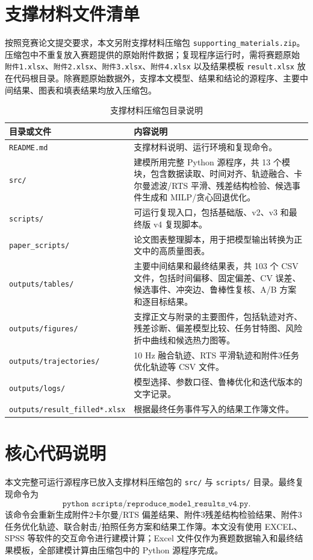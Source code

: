 \documentclass{cumcmthesis}
\begin{document}
\clearpage
\appendix
\section{支撑材料文件清单}
按照竞赛论文提交要求，本文另附支撑材料压缩包 \texttt{supporting\_materials.zip}。压缩包中不重复放入赛题提供的原始附件数据；复现程序运行时，需将赛题原始 \texttt{附件1.xlsx}、\texttt{附件2.xlsx}、\texttt{附件3.xlsx}、\texttt{附件4.xlsx} 以及结果模板 \texttt{result.xlsx} 放在代码根目录。除赛题原始数据外，支撑本文模型、结果和结论的源程序、主要中间结果、图表和填表结果均放入压缩包。

\begin{table}[H]
  \centering
  \caption{支撑材料压缩包目录说明}
  \label{tab:supporting_materials}
  \footnotesize
  \begin{tabular}{p{}p{}}
    \toprule
    目录或文件 & 内容说明\\
    \midrule
    \texttt{README.md} & 支撑材料说明、运行环境和复现命令。\\
    \texttt{src/} & 建模所用完整 Python 源程序，共 13 个模块，包含数据读取、时间对齐、轨迹融合、卡尔曼滤波/RTS 平滑、残差结构检验、候选事件生成和 MILP/贪心回退优化。\\
    \texttt{scripts/} & 可运行复现入口，包括基础版、v2、v3 和最终版 v4 复现脚本。\\
    \texttt{paper\_scripts/} & 论文图表整理脚本，用于把模型输出转换为正文中的高质量图表。\\
    \texttt{outputs/tables/} & 主要中间结果和最终结果表，共 103 个 CSV 文件，包括时间偏移、固定偏差、CV 误差、候选事件、冲突边、鲁棒性复核、A/B 方案和逐目标结果。\\
    \texttt{outputs/figures/} & 支撑正文与附录的主要图件，包括轨迹对齐、残差诊断、偏差模型比较、任务甘特图、风险折中曲线和候选热力图等。\\
    \texttt{outputs/trajectories/} & 10 Hz 融合轨迹、RTS 平滑轨迹和附件3任务优化轨迹等 CSV 文件。\\
    \texttt{outputs/logs/} & 模型选择、参数口径、鲁棒优化和迭代版本的文字记录。\\
    \texttt{outputs/result\_filled*.xlsx} & 根据最终任务事件写入的结果工作簿文件。\\
    \bottomrule
  \end{tabular}
\end{table}

\section{核心代码说明}
本文完整可运行源程序已放入支撑材料压缩包的 \texttt{src/} 与 \texttt{scripts/} 目录。最终复现命令为
\[
  \texttt{python scripts/reproduce\_model\_results\_v4.py}.
\]
该命令会重新生成附件2卡尔曼/RTS 偏差结果、附件3残差结构检验结果、附件3任务优化轨迹、联合射击/拍照任务方案和结果工作簿。本文没有使用 EXCEL、SPSS 等软件的交互命令进行建模计算；Excel 文件仅作为赛题数据输入和最终结果模板，全部建模计算由压缩包中的 Python 源程序完成。
\end{document}
